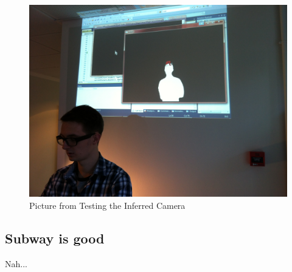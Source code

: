 \begin{figure}[htbp]
\centering
\includegraphics[width=1.00\textwidth]{Pictures/Test/IMG_1477.jpg}
\caption{Picture from Testing the Inferred Camera}
\label{fig:Picture from Testing the Inferred Camera}
\end{figure}

\subsection{Subway is good}
Nah...